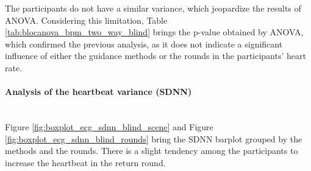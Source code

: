 The participants do not have a similar variance, which jeopardize the results of ANOVA. Considering this limitation, Table \ref{tab:blocanova_bpm_two_way_blind} brings the p-value obtained by ANOVA, which confirmed the previous analysis, as it does not indicate a significant influence of either the guidance methods or the rounds in the participants' heart rate. 




\paragraph*{Analysis of the heartbeat variance (SDNN)}\mbox{}\\

Figure \ref{fig:boxplot_ecg_sdnn_blind_scene} and Figure \ref{fig:boxplot_ecg_sdnn_blind_rounds} bring the SDNN barplot grouped by the methods and the rounds. There is a slight tendency among the participants to increase the heartbeat in the return round.

